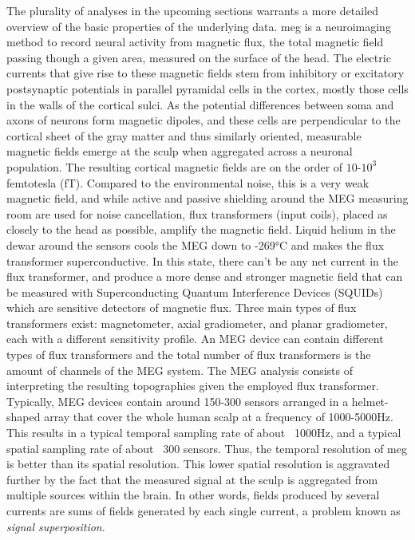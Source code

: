 The plurality of analyses in the upcoming sections warrants a more detailed overview of the basic properties of the underlying data.
\gls{meg} is a neuroimaging method to record neural activity from magnetic flux, the total magnetic field passing though a given area, measured on the surface of the head.
The electric currents that give rise to these magnetic fields stem from inhibitory or excitatory postsynaptic potentials in parallel pyramidal cells in the cortex, mostly those cells in the walls of the cortical sulci.
As the potential differences between soma and axons of neurons form magnetic dipoles, and these cells are perpendicular to the cortical sheet of the gray matter and thus similarly oriented, measurable magnetic fields emerge at the sculp when aggregated across a neuronal population.
The resulting cortical magnetic fields are on the order of $10$-$10^{3}$ femtotesla (fT).
Compared to the environmental noise, this is a very weak magnetic field, and while active and passive shielding around the MEG measuring room are used for noise cancellation, flux transformers (input coils), placed as closely to the head as possible, amplify the magnetic field.
Liquid helium in the dewar around the sensors cools the MEG down to -269°C and makes the flux transformer superconductive.
In this state, there can’t be any net current in the flux transformer, and produce a more dense and stronger magnetic field that can be measured with Superconducting Quantum Interference Devices (SQUIDs) which are sensitive detectors of magnetic flux.
Three main types of flux transformers exist: magnetometer, axial gradiometer, and planar gradiometer, each with a different sensitivity profile.
An MEG device can contain different types of flux transformers and the total number of flux transformers is the amount of channels of the MEG system.
The MEG analysis consists of interpreting the resulting topographies given the employed flux transformer.
Typically, MEG devices contain around 150-300 sensors arranged in a helmet-shaped array that cover the whole human scalp at a frequency of 1000-5000Hz.
This results in a typical temporal sampling rate of about ~1000Hz, and a typical spatial sampling rate of about ~300 sensors.
Thus, the temporal resolution of \gls{meg} is better than its spatial resolution.
This lower spatial resolution is aggravated further by the fact that the measured signal at the sculp is aggregated from multiple sources within the brain.
In other words, fields produced by several currents are sums of fields generated by each single current, a problem known as \textit{signal superposition}.





